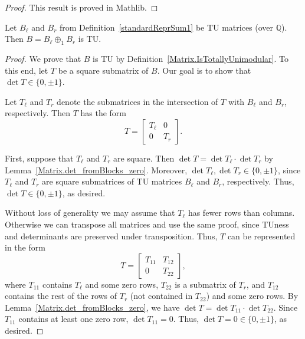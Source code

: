 \begin{proof}
    \leanok
    This result is proved in Mathlib.
\end{proof}

\begin{lemma}
    \label{Matrix.fromBlocks_isTotallyUnimodular}
    \leanok
    Let $B_{\ell}$ and $B_{r}$ from Definition~\ref{standardReprSum1} be TU matrices (over $\mathbb{Q}$). Then $B = B_{\ell} \oplus_{1} B_{r}$ is TU.
\end{lemma}

\begin{proof}
    \leanok
    We prove that $B$ is TU by Definition~\ref{Matrix.IsTotallyUnimodular}. To this end, let $T$ be a square submatrix of $B$. Our goal is to show that $\det T \in \{0, \pm 1\}$.

    Let $T_{\ell}$ and $T_{r}$ denote the submatrices in the intersection of $T$ with $B_{\ell}$ and $B_{r}$, respectively. Then $T$ has the form
    \[
        T = \begin{bmatrix} T_{\ell} & 0 \\ 0 & T_{r} \end{bmatrix}.
    \]

    First, suppose that $T_{\ell}$ and $T_{r}$ are square. Then $\det T = \det T_{\ell} \cdot \det T_{r}$ by Lemma~\ref{Matrix.det_fromBlocks_zero}. Moreover, $\det T_{\ell}, \det T_{r} \in \{0, \pm 1\}$, since $T_{\ell}$ and $T_{r}$ are square submatrices of TU matrices $B_{\ell}$ and $B_{r}$, respectively. Thus, $\det T \in \{0, \pm 1\}$, as desired.

    Without loss of generality we may assume that $T_{\ell}$ has fewer rows than columns. Otherwise we can transpose all matrices and use the same proof, since TUness and determinants are preserved under transposition. Thus, $T$ can be represented in the form
    \[
        T = \begin{bmatrix} T_{11} & T_{12} \\ 0 & T_{22} \end{bmatrix},
    \]
    where $T_{11}$ contains $T_{\ell}$ and some zero rows, $T_{22}$ is a submatrix of $T_{r}$, and $T_{12}$ contains the rest of the rows of $T_{r}$ (not contained in $T_{22}$) and some zero rows. By Lemma~\ref{Matrix.det_fromBlocks_zero}, we have $\det T = \det T_{11} \cdot \det T_{22}$. Since $T_{11}$ contains at least one zero row, $\det T_{11} = 0$. Thus, $\det T = 0 \in \{0, \pm 1\}$, as desired.
\end{proof}


